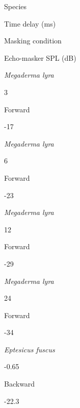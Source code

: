\documentclass[
]{book}
\begin{document}
Species

Time delay (ms)

Masking condition

Echo-masker SPL (dB)

\citep{siewert2004a}

\emph{Megaderma lyra}

3

Forward

-17

\citep{siewert2004a}

\emph{Megaderma lyra}

6

Forward

-23

\citep{siewert2004a}

\emph{Megaderma lyra}

12

Forward

-29

\citep{siewert2004a}

\emph{Megaderma lyra}

24

Forward

-34

\citep{suemer2009a}

\emph{Eptesicus fuscus}

-0.65

Backward

-22.3

\newpage
\end{document}
